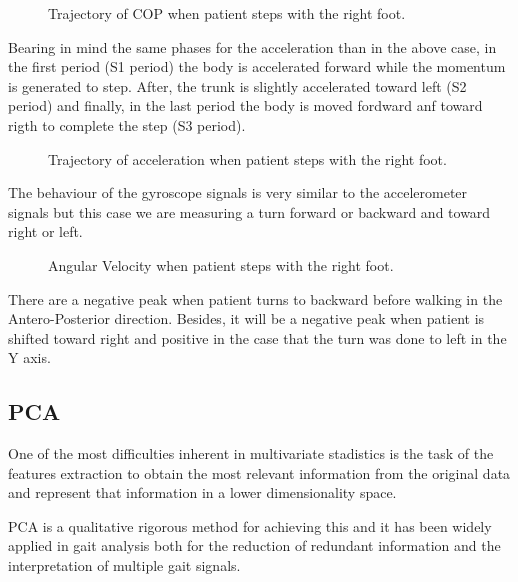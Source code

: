 \begin{figure}[H]
	\centering
	\caption{Trajectory of COP when patient steps with the right foot.}
	\label{fig:trajectoryCOP}
\end{figure} 
                 

Bearing in mind the same phases for the acceleration than in the above case, in the first period (S1 period) the body is accelerated forward while the momentum is generated to step. After, the trunk is slightly accelerated toward left (S2 period) and finally, in the last period the body is moved fordward anf toward rigth to complete the step (S3 period). 

\begin{figure}[H]
	\centering
	\caption{Trajectory of acceleration when patient steps with the right foot.}
	\label{fig:trajectoryAcc}
\end{figure} 

The behaviour of the gyroscope signals is very similar to the accelerometer signals but this case we are measuring a turn forward or backward and toward right or left. 

\begin{figure}[H]
	\centering
	\caption{Angular Velocity when patient steps with the right foot.}
	\label{fig:GyroTrunk}
\end{figure} 

There are a negative peak when patient turns to backward before walking in the Antero-Posterior direction. Besides, it will be a negative peak when patient is shifted toward right and positive in the case that the turn was done to left in the Y axis.


\subsection{PCA}
One of the most difficulties inherent in multivariate stadistics is the task of the features extraction to obtain the most relevant information from the original data and represent that information in a lower dimensionality space.

PCA is a qualitative rigorous method for achieving this and it has been widely applied in gait analysis both for the reduction of redundant information and the interpretation of multiple gait signals\cite{PCA}.

